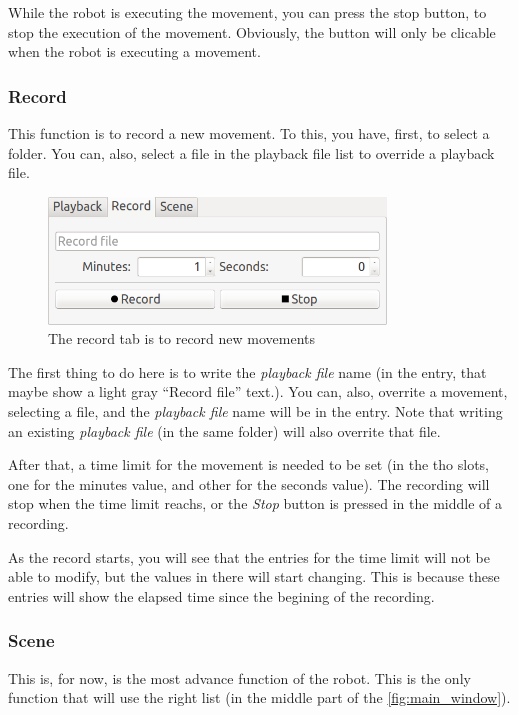 \documentclass[oneside,a4paper,titlepage]{article}
\begin{document}
	While the robot is executing the movement, you can press the stop button, to stop the execution of the movement. Obviously, the button will only be clicable when the robot is executing a movement.
	
\subsubsection{Record}
\label{subsec:record}
	This function is to record a new movement. To this, you have, first, to select a folder. You can, also, select a file in the playback file list to override a playback file.
	
	\begin{figure}[ht!]
		\centering
		\includegraphics[width=0.8\textwidth]{record_tab}
		\caption[Record Tab]{The record tab is to record new movements}
		\label{fig:record_tab}
	\end{figure}
	
	The first thing to do here is to write the \emph{playback file} name (in the entry, that maybe show a light gray ``Record file'' text.). You can, also, overrite a movement, selecting a file, and the \emph{playback file} name will be in the entry. Note that writing an existing \emph{playback file} (in the same folder) will also overrite that file.
	
	After that, a time limit for the movement is needed to be set (in the tho slots, one for the minutes value, and other for the seconds value). The recording will stop when the time limit reachs, or the \emph{Stop} button is pressed in the middle of a recording.
	
	As the record starts, you will see that the entries for the time limit will not be able to modify, but the values in there will start changing. This is because these entries will show the elapsed time since the begining of the recording.
	
\subsubsection{Scene}
\label{subsec:scene}
	This is, for now, is the most advance function of the robot. This is the only function that will use the right list (in the middle part of the \ref{fig:main_window}).
\end{document}
